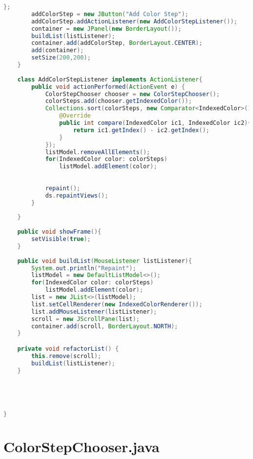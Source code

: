 \documentclass[pdftex,a4paper,10pt,titlepage]{article}
\begin{document}
\begin{lstlisting}[language=java, breaklines=true]
        };
        addColorStep = new JButton("Add Color Step");
        addColorStep.addActionListener(new AddColorStepListener());
        container = new JPanel(new BorderLayout());
        buildList(listListener);
        container.add(addColorStep, BorderLayout.CENTER);
        add(container);
        setSize(200,200);
    }
    
    class AddColorStepListener implements ActionListener{
        public void actionPerformed(ActionEvent e) {
            ColorStepChooser chooser = new ColorStepChooser();
            colorSteps.add(chooser.getIndexedColor());
            Collections.sort(colorSteps, new Comparator<IndexedColor>() {
                @Override
                public int compare(IndexedColor ic1, IndexedColor ic2){
                    return ic1.getIndex() - ic2.getIndex();
                }
            });
            listModel.removeAllElements();
            for(IndexedColor color: colorSteps)
                listModel.addElement(color);
            
            
            repaint();
            ds.repaintViews();
        }
        
    }
    
    public void showFrame(){
        setVisible(true);
    }
    
    public void buildList(MouseListener listListener){        
        System.out.println("Repaint");
        listModel = new DefaultListModel<>();
        for(IndexedColor color: colorSteps)
            listModel.addElement(color);
        list = new JList<>(listModel);
        list.setCellRenderer(new IndexedColorRenderer());
        list.addMouseListener(listListener);
        scroll = new JScrollPane(list);
        container.add(scroll, BorderLayout.NORTH);
    }

    private void refactorList() {
        this.remove(scroll);
        buildList(listListener);
    }
    
    
    
    
    
}

\end{lstlisting}


\section{ColorStepChooser.java}
\end{document}
